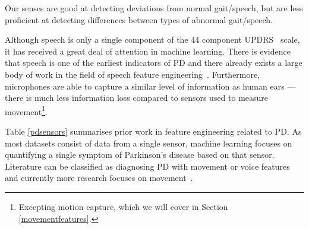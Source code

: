 \documentclass[12pt, twoside]{book}
\begin{document}
\begin{highlight}
Our senses are good at detecting deviations from normal gait/speech, but are less proficient at detecting differences between types of abnormal gait/speech. 
\end{highlight}

Although speech is only a single component of the 44 component UPDRS~\cite{updrs} scale, it has received a great deal of attention in machine learning. There is evidence that speech is one of the earliest indicators of PD \cite{earlyvowel} and there already exists a large body of work in the field of speech feature engineering~\cite{ostextbook}. Furthermore, microphones are able to capture a similar level of information as human ears --- there is much less information loss compared to sensors used to measure movement\footnote{Excepting motion capture, which we will cover in Section \ref{movementfeatures}.}. 


Table \ref{pdsensors} summarises prior work in feature engineering related to PD. As most datasets consist of data from a single sensor, machine learning focuses on quantifying a single symptom of Parkinson's disease based on that sensor. Literature can be classified as diagnosing PD with movement or voice features and currently more research focuses on movement~\cite{review2013,review2015}.
\end{document}
